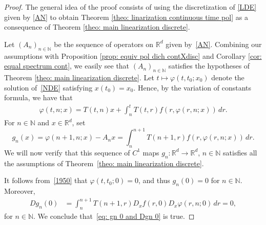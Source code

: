 \documentclass[reqno, a4paper, 10pt]{amsart}
\theoremstyle{plain}
\numberwithin{equation}{section}
\theoremstyle{remark}
\renewcommand{\phi}{\varphi}
\def\N{\mathbb{N}}
\def\R{\mathbb{R}}
\begin{document}
\begin{proof} The general idea of the proof consists of using the discretization of \eqref{LDE} given by \eqref{AN} to obtain Theorem \ref{theo: linarization continuous time pol} as a consequence of Theorem \ref{theo: main linearization discrete}.


Let $(A_n)_{n\in \N}$ be the sequence of operators on $\R^d$ given by~\eqref{AN}. Combining our assumptions with Proposition \ref{prop: equiv pol dich contXdisc} and Corollary \ref{cor: equal spectrum cont}, we easily see that $(A_n)_{n\in \N}$ satisfies the hypotheses of Theorem \ref{theo: main linearization discrete}. Let $t\mapsto \varphi (t, t_0; x_0)$ denote the solution of~\eqref{NDE} satisfying $x(t_0)=x_0$. Hence, by the variation of constants formula, we have that 
\begin{align}\label{def-phi}
\phi(t, n; x)=T(t,n)x+\int_n^t T(t,r)f(r, \phi(r, n;x))\, dr.
\end{align}
For $n\in \N$ and $x\in \R^d$, set 
\begin{equation}\label{eq: def gn cont case}
g_n(x)=\phi(n+1, n;x)-A_n x=\int_n^{n+1}T(n+1, r)f(r, \phi(r,n;x))\, dr.
\end{equation}
We will now verify that this sequence of $C^1$ maps $g_n:\mathbb{R}^d\to \mathbb{R}^d$, $n\in \N$ satisfies all the assumptions of Theorem~\ref{theo: main linearization discrete}.

It follows from~\eqref{1950} that  $\phi(t, t_0;0)=0$, and thus $g_n(0)=0$ for $n\in \N$. Moreover, 
\[
\begin{split}
Dg_n(0)
&=\int_n^{n+1}T(n+1, r)D_xf(r, 0)D_x \phi(r,n;0)\, dr =0,
\end{split}
\]
for $n\in \N$. We conclude that~\eqref{eq: gn 0 and Dgn 0} is true.


\end{proof}
\end{document}
